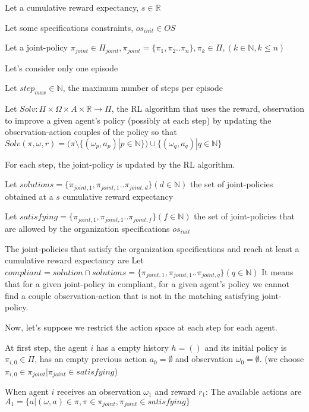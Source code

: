 \documentclass{ecai}
\begin{document}
    Let a cumulative reward expectancy, $s \in \mathbb{R}$
    
    Let some specifications constraints, $os_{init} \in OS$
    
    Let a joint-policy $\pi_{joint} \in \Pi_{joint}, \allowbreak \pi_{joint} = \{\pi_1,\pi_2..\pi_n\}, \pi_k \in \Pi,(k \in \mathbb{N}, k \leq n)$
    
    Let's consider only one episode
    
    Let $step_{max} \in \mathbb{N}$, the maximum number of steps per episode
    
    Let $Solv: \Pi \times \Omega \times A \times \mathbb{R} \rightarrow \Pi$, the RL algorithm that uses the reward, observation to improve a given agent's policy (possibly at each step) by updating the observation-action couples of the policy so that $Solv(\pi, \omega, r) = (\pi \setminus \{(\omega_p, a_p) | p \in \mathbb{N}\}) \cup \{(\omega_q, a_q) | q \in \mathbb{N}\}$
    
    For each step, the joint-policy is updated by the RL algorithm.
    
    Let $solutions = \{\pi_{joint,1}, \pi_{joint,1}.. \pi_{joint,d}\} (d \in \mathbb{N})$ the set of joint-policies obtained at a $s$ cumulative reward expectancy
    
    Let $satisfying = \{\pi_{joint,1}, \pi_{joint,1}.. \pi_{joint,f}\} (f \in \mathbb{N})$ the set of joint-policies that are allowed by the organization specifications $os_{init}$
    
    The joint-policies that satisfy the organization specifications and reach at least a cumulative reward expectancy are
    Let $compliant = solution \cap solutions = \{\pi_{joint,1}, \pi_{joint,1}.. \pi_{joint,q}\} (q \in \mathbb{N})$
    It means that for a given joint-policy in compliant, for a given agent's policy we cannot find a couple observation-action that is not in the matching satisfying joint-policy.

    Now, let's suppose we restrict the action space at each step for each agent.

    At first step, the agent $i$ has a empty history $h = ()$ and its initial policy is $\pi_{i,0} \in \Pi$, has an empty previous action $a_0 = \emptyset$ and observation $\omega_0 = \emptyset$.
    (we choose $\pi_{i,0} \in \pi_{joint} | \pi_{joint} \in satisfying$)

    When agent $i$ receives an observation $\omega_{1}$ and reward $r_1$:
    The available actions are $A_1 = \{a | (\omega, a) \in \pi, \pi \in \pi_{joint},\pi_{joint} \in satisfying\}$
\end{document}
